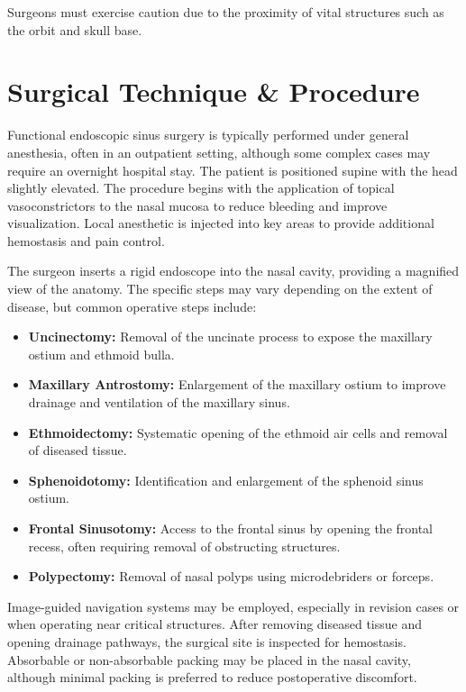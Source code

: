 Surgeons must exercise caution due to the proximity of vital structures such as the orbit and skull base.

\section*{Surgical Technique \& Procedure}
Functional endoscopic sinus surgery is typically performed under general anesthesia, often in an outpatient setting, although some complex cases may require an overnight hospital stay. The patient is positioned supine with the head slightly elevated. The procedure begins with the application of topical vasoconstrictors to the nasal mucosa to reduce bleeding and improve visualization. Local anesthetic is injected into key areas to provide additional hemostasis and pain control.

The surgeon inserts a rigid endoscope into the nasal cavity, providing a magnified view of the anatomy. The specific steps may vary depending on the extent of disease, but common operative steps include:

\begin{itemize}
  \item \textbf{Uncinectomy:} Removal of the uncinate process to expose the maxillary ostium and ethmoid bulla.
  \item \textbf{Maxillary Antrostomy:} Enlargement of the maxillary ostium to improve drainage and ventilation of the maxillary sinus.
  \item \textbf{Ethmoidectomy:} Systematic opening of the ethmoid air cells and removal of diseased tissue.
  \item \textbf{Sphenoidotomy:} Identification and enlargement of the sphenoid sinus ostium.
  \item \textbf{Frontal Sinusotomy:} Access to the frontal sinus by opening the frontal recess, often requiring removal of obstructing structures.
  \item \textbf{Polypectomy:} Removal of nasal polyps using microdebriders or forceps.
\end{itemize}

Image-guided navigation systems may be employed, especially in revision cases or when operating near critical structures. After removing diseased tissue and opening drainage pathways, the surgical site is inspected for hemostasis. Absorbable or non-absorbable packing may be placed in the nasal cavity, although minimal packing is preferred to reduce postoperative discomfort.

